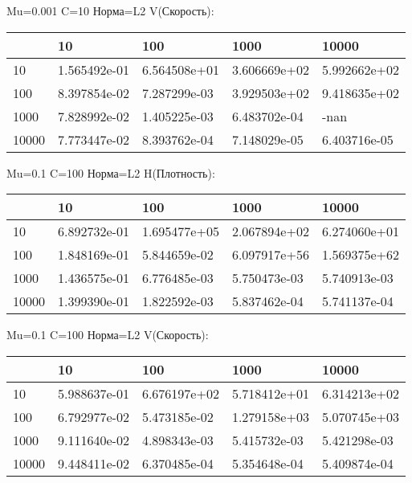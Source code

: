 \documentclass[a4paper, 12pt]{article}
\begin{document}
\bigskip
\bigskip
\bigskip


Mu=0.001  C=10 Норма=L2 V(Скорость):


\begin{tabular}{lllll}
\toprule
{} &         10    &         100   &         1000  &         10000 \\
\midrule
10    &  1.565492e-01 &  6.564508e+01 &  3.606669e+02 &  5.992662e+02 \\
100   &  8.397854e-02 &  7.287299e-03 &  3.929503e+02 &  9.418635e+02 \\
1000  &  7.828992e-02 &  1.405225e-03 &  6.483702e-04 &          -nan \\
10000 &  7.773447e-02 &  8.393762e-04 &  7.148029e-05 &  6.403716e-05 \\
\bottomrule
\end{tabular}



\bigskip
\bigskip
\bigskip


Mu=0.1  C=100 Норма=L2 H(Плотность):


\begin{tabular}{lllll}
\toprule
{} &         10    &         100   &         1000  &         10000 \\
\midrule
10    &  6.892732e-01 &  1.695477e+05 &  2.067894e+02 &  6.274060e+01 \\
100   &  1.848169e-01 &  5.844659e-02 &  6.097917e+56 &  1.569375e+62 \\
1000  &  1.436575e-01 &  6.776485e-03 &  5.750473e-03 &  5.740913e-03 \\
10000 &  1.399390e-01 &  1.822592e-03 &  5.837462e-04 &  5.741137e-04 \\
\bottomrule
\end{tabular}



\bigskip
\bigskip
\bigskip


Mu=0.1  C=100 Норма=L2 V(Скорость):


\begin{tabular}{lllll}
\toprule
{} &         10    &         100   &         1000  &         10000 \\
\midrule
10    &  5.988637e-01 &  6.676197e+02 &  5.718412e+01 &  6.314213e+02 \\
100   &  6.792977e-02 &  5.473185e-02 &  1.279158e+03 &  5.070745e+03 \\
1000  &  9.111640e-02 &  4.898343e-03 &  5.415732e-03 &  5.421298e-03 \\
10000 &  9.448411e-02 &  6.370485e-04 &  5.354648e-04 &  5.409874e-04 \\
\bottomrule
\end{tabular}
\end{document}
